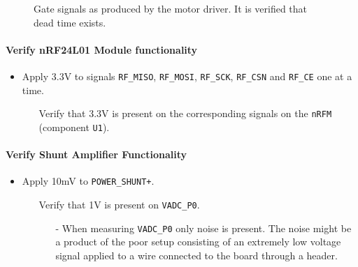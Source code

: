 \begin{figure}[h]
	\centering
    
	\caption[Dead time on gate signals.]{Gate signals as produced by the motor driver. It is verified that dead time exists.}
	\label{fig:controllerboardv2_gate_b_deadtime}
\end{figure}

\paragraph{Verify nRF24L01 Module functionality} %
\label{par:verify_nrf24l01_module_functionality}
\begin{itemize}
	\item Apply 3.3V to signals \texttt{RF\_MISO}, \texttt{RF\_MOSI}, \texttt{RF\_SCK}, \texttt{RF\_CSN} and \texttt{RF\_CE} one at a time.
	\begin{itemize}
		\item[\cmark] Verify that 3.3V is present on the corresponding signals on the \texttt{nRFM} (component \texttt{U1}).
	\end{itemize}
\end{itemize}

\paragraph{Verify Shunt Amplifier Functionality} %
\label{par:verify_shunt_amplifier_functionality}
\begin{itemize}
	\item Apply 10mV to \texttt{POWER\_SHUNT+}.
	\begin{itemize}
		\item[\xmark] Verify that 1V is present on \texttt{VADC\_P0}.
		\begin{itemize}
			\item[-] When measuring \texttt{VADC\_P0} only noise is present. 
			The noise might be a product of the poor setup consisting of an extremely low voltage signal applied to a wire connected to the board through a header. 
		\end{itemize}
	\end{itemize}
\end{itemize}


